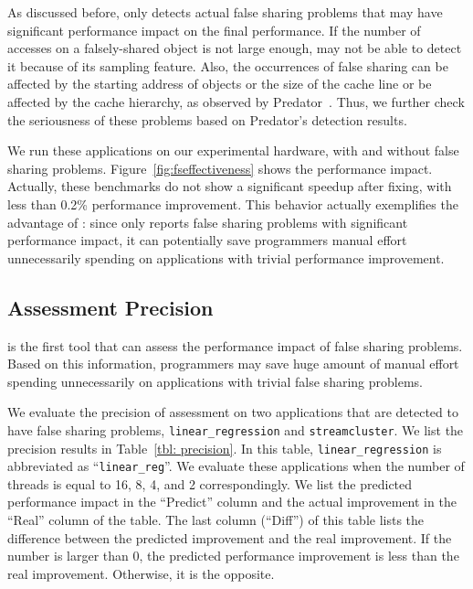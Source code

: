 As discussed before, \cheetah{} only detects actual false sharing problems that may have significant performance impact on the final performance. If the number of accesses on a falsely-shared object is not large enough, \cheetah{} may not be able to detect it because of its sampling feature.  Also, the occurrences of false sharing can be affected by the starting address of objects or the size of the cache line or be affected by the cache hierarchy, as observed by Predator~\cite{Predator}. Thus, we further check the seriousness of these problems based on Predator's detection results. 

We run these applications on our experimental hardware, with and without false sharing problems. Figure~\ref{fig:fseffectiveness} shows the performance impact. Actually, these benchmarks do not show a significant speedup after fixing, with less than 0.2\% performance improvement. This behavior actually exemplifies the advantage of \Cheetah{}: since \cheetah{} only reports false sharing problems with significant performance impact, it can potentially save programmers manual effort unnecessarily spending on applications with trivial performance improvement. 

\subsection{Assessment Precision}
\label{sec:precision}

\cheetah{} is the first tool that can assess the performance impact of false sharing problems. Based on this information, programmers may save huge amount of manual effort spending unnecessarily on applications with trivial false sharing problems. 

We evaluate the precision of assessment on two applications that are detected to have false sharing problems, \texttt{linear\_regression} and \texttt{streamcluster}. We list the precision results in Table~\ref{tbl: precision}. In this table, \texttt{linear\_regression} is abbreviated as ``\texttt{linear\_reg}''.  We evaluate these applications when the number of threads is equal to 16, 8, 4, and 2 correspondingly. We list the predicted performance impact in the ``Predict'' column and the actual improvement in the ``Real'' column of the table. The last column (``Diff'') of this table lists the difference between the predicted improvement and the real improvement. If the number is larger than 0, the predicted performance improvement is less than the real improvement. Otherwise, it is the opposite. 

